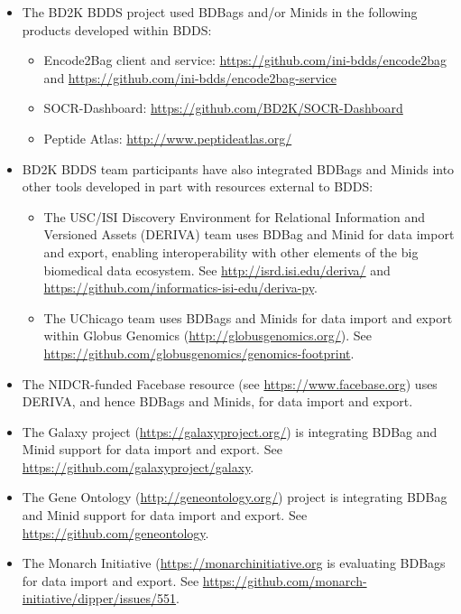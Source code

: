 \documentclass[11pt]{article}
\begin{document}
\begin{itemize}
\item
The BD2K BDDS project used BDBags and/or Minids in the following products developed within BDDS:
\begin{itemize}
\item
Encode2Bag client and service: \url{https://github.com/ini-bdds/encode2bag} and 
\url{https://github.com/ini-bdds/encode2bag-service}

\item
SOCR-Dashboard: \url{https://github.com/BD2K/SOCR-Dashboard}

\item
Peptide Atlas: \url{http://www.peptideatlas.org/}
\end{itemize}

\item
BD2K BDDS team participants have also integrated BDBags and Minids into other tools 
developed in part with resources external to BDDS:
\begin{itemize}
\item
The USC/ISI Discovery Environment for Relational Information and Versioned Assets (DERIVA) 
team uses BDBag and Minid for data import and export, enabling interoperability with other elements of the big biomedical data ecosystem. See \url{http://isrd.isi.edu/deriva/} and \url{https://github.com/informatics-isi-edu/deriva-py}.
\item
The UChicago team uses BDBags and Minids for data import and export within Globus Genomics 
(\url{http://globusgenomics.org/}). See \url{https://github.com/globusgenomics/genomics-footprint}.
\end{itemize}

\item
The NIDCR-funded Facebase resource (see \url{https://www.facebase.org}) uses DERIVA, and hence BDBags and Minids, for data import and export.

\item
The Galaxy project (\url{https://galaxyproject.org/}) is integrating BDBag and Minid support for data import and export. 
See \url{https://github.com/galaxyproject/galaxy}.

\item
The Gene Ontology (\url{http://geneontology.org/}) project is integrating BDBag and Minid support for data import and export.
See \url{https://github.com/geneontology}.

\item
The Monarch Initiative (\url{https://monarchinitiative.org} is evaluating BDBags for data import and export. See
\url{https://github.com/monarch-initiative/dipper/issues/551}.


\end{itemize}
\end{document}
